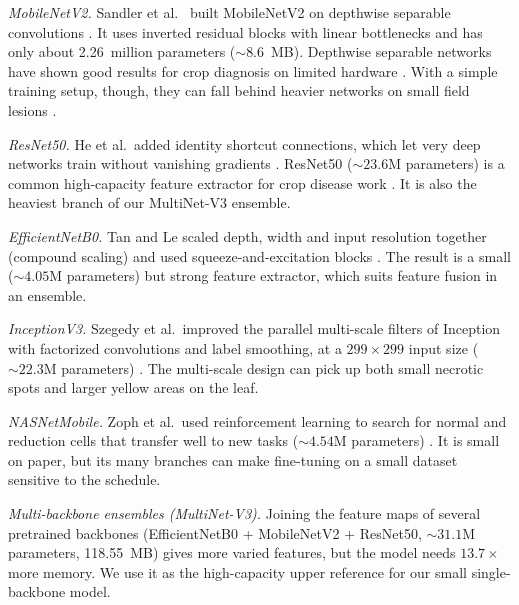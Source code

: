 \textit{MobileNetV2.} Sandler et al.\ \cite{sandler2018mobilenetv2} built MobileNetV2 on depthwise separable convolutions \cite{howard2017mobilenets}. It uses inverted residual blocks with linear bottlenecks and has only about 2.26~million parameters ($\sim 8.6$~MB). Depthwise separable networks have shown good results for crop diagnosis on limited hardware \cite{kc2019depthwise}. With a simple training setup, though, they can fall behind heavier networks on small field lesions \cite{too2019comparative}.

\textit{ResNet50.} He et al.\ added identity shortcut connections, which let very deep networks train without vanishing gradients \cite{he2016deep}. ResNet50 ($\sim 23.6$M parameters) is a common high-capacity feature extractor for crop disease work \cite{brahimi2017deep}. It is also the heaviest branch of our MultiNet-V3 ensemble.

\textit{EfficientNetB0.} Tan and Le scaled depth, width and input resolution together (compound scaling) and used squeeze-and-excitation blocks \cite{tan2019efficientnet}. The result is a small ($\sim 4.05$M parameters) but strong feature extractor, which suits feature fusion in an ensemble.

\textit{InceptionV3.} Szegedy et al.\ improved the parallel multi-scale filters of Inception with factorized convolutions and label smoothing, at a $299 \times 299$ input size ($\sim 22.3$M parameters) \cite{szegedy2016rethinking}. The multi-scale design can pick up both small necrotic spots and larger yellow areas on the leaf.

\textit{NASNetMobile.} Zoph et al.\ used reinforcement learning to search for normal and reduction cells that transfer well to new tasks ($\sim 4.54$M parameters) \cite{zoph2018learning}. It is small on paper, but its many branches can make fine-tuning on a small dataset sensitive to the schedule.

\textit{Multi-backbone ensembles (MultiNet-V3).} Joining the feature maps of several pretrained backbones (EfficientNetB0 + MobileNetV2 + ResNet50, $\sim 31.1$M parameters, 118.55~MB) gives more varied features, but the model needs $13.7\times$ more memory. We use it as the high-capacity upper reference for our small single-backbone model.


